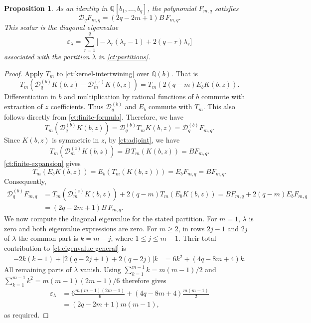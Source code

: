 \documentclass[reqno, 12pt]{article}
\numberwithin{equation}{section}
\newtheorem{proposition}[theorem]{Proposition}
\theoremstyle{definition}
\begin{document}
\begin{proposition}\label{ct:eigenfunction}
As an identity in $\mathbb Q[b_1,\ldots,b_q]$, the polynomial
$F_{m,q}$ satisfies
\begin{equation}\label{ct:eigen-equation}
 \mathcal D_qF_{m,q}=(2q-2m+1)B\,F_{m,q}.
\end{equation}
This scalar is the diagonal eigenvalue
\begin{equation}\label{ct:eigenvalue-general}
 \varepsilon_\lambda
 =\sum_{r=1}^q
 \bigl[-\lambda_r(\lambda_r-1)+2(q-r)\lambda_r\bigr]
\end{equation}
associated with the partition $\lambda$ in
\eqref{ct:partitions}.
\end{proposition}

\begin{proof}
Apply $T_m$ to \eqref{ct:kernel-intertwining} over
$\mathbb Q(b)$. That is 
$$T_m\left(\mathcal D_q^{(b)}K(b,z)-\mathcal D_m^{(z)}K(b,z)\right)=T_m\left(2(q-m)E_bK(b,z)\right).$$
Differentiation in $b$ and multiplication by
rational functions of $b$ commute with extraction of $z$ coefficients.
Thus $\mathcal D_q^{(b)}$ and $E_b$ commute with $T_m$.
This also follows directly from \eqref{ct:finite-formula}.
Therefore, we have
$$T_m(\mathcal D_q^{(b)}K(b,z))=\mathcal D_q^{(b)}T_mK(b,z)=\mathcal{D}_q^{(b)} F_{m,q}.$$
Since $K(b,z)$ is symmetric in $z$, by \cref{ct:adjoint}, we have 
$$T_m(\mathcal D_m^{(z)}K(b,z))=B\,T_m(K(b,z))=BF_{m,q}.$$
\cref{ct:finite-expansion} gives 
$$T_m(E_b K(b,z))=E_b(T_m(K(b,z)))= E_bF_{m,q}=BF_{m,q}.$$
Consequently,
\[\begin{aligned}
 \mathcal D_q^{(b)}F_{m,q}
 &=T_m(\mathcal D_m^{(z)}K(b,z))+2(q-m)T_m(E_bK(b,z))=BF_{m,q}+2(q-m)E_bF_{m,q}\\
 &=(2q-2m+1)B\,F_{m,q}.
 \end{aligned}
\]
We now compute the diagonal eigenvalue for the stated partition.
For $m=1$, $\lambda$ is zero and both eigenvalue expressions
are zero.  For $m\geq2$, in rows $2j-1$ and $2j$ of $\lambda$ the common
part is $k=m-j$, where $1\leq j\leq m-1$.  Their total
contribution to \eqref{ct:eigenvalue-general} is
\[
 \begin{aligned}
 -2k(k-1)+\bigl[2(q-2j+1)+2(q-2j)\bigr]k
 &=6k^2+(4q-8m+4)k.
 \end{aligned}
\]
All remaining parts of $\lambda$ vanish.  Using
$\sum_{k=1}^{m-1}k=m(m-1)/2$ and
$\sum_{k=1}^{m-1}k^2=m(m-1)(2m-1)/6$ therefore gives
\[
 \begin{aligned}
 \varepsilon_\lambda
 &=6\frac{m(m-1)(2m-1)}6
   +(4q-8m+4)\frac{m(m-1)}2\\
 &=(2q-2m+1)m(m-1),
 \end{aligned}
\]
as required.
\end{proof}
\end{document}
